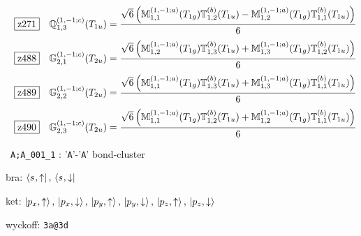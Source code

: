 \documentclass[fleqn,10pt,landscape]{jsarticle}
\begin{document}
\begin{dmath*}
\hspace*{3mm}\fbox{z271}\quad \mathbb{Q}_{1,3}^{(1,-1;c)}(T_{1u})=\frac{\sqrt{6} \left(\mathbb{M}_{1,1}^{(1,-1;a)}(T_{1g}) \mathbb{T}_{1,2}^{(b)}(T_{1u}) - \mathbb{M}_{1,2}^{(1,-1;a)}(T_{1g}) \mathbb{T}_{1,1}^{(b)}(T_{1u})\right)}{6}
\end{dmath*}
\begin{dmath*}
\hspace*{3mm}\fbox{z488}\quad \mathbb{G}_{2,1}^{(1,-1;c)}(T_{2u})=\frac{\sqrt{6} \left(\mathbb{M}_{1,2}^{(1,-1;a)}(T_{1g}) \mathbb{T}_{1,3}^{(b)}(T_{1u}) + \mathbb{M}_{1,3}^{(1,-1;a)}(T_{1g}) \mathbb{T}_{1,2}^{(b)}(T_{1u})\right)}{6}
\end{dmath*}
\begin{dmath*}
\hspace*{3mm}\fbox{z489}\quad \mathbb{G}_{2,2}^{(1,-1;c)}(T_{2u})=\frac{\sqrt{6} \left(\mathbb{M}_{1,1}^{(1,-1;a)}(T_{1g}) \mathbb{T}_{1,3}^{(b)}(T_{1u}) + \mathbb{M}_{1,3}^{(1,-1;a)}(T_{1g}) \mathbb{T}_{1,1}^{(b)}(T_{1u})\right)}{6}
\end{dmath*}
\begin{dmath*}
\hspace*{3mm}\fbox{z490}\quad \mathbb{G}_{2,3}^{(1,-1;c)}(T_{2u})=\frac{\sqrt{6} \left(\mathbb{M}_{1,1}^{(1,-1;a)}(T_{1g}) \mathbb{T}_{1,2}^{(b)}(T_{1u}) + \mathbb{M}_{1,2}^{(1,-1;a)}(T_{1g}) \mathbb{T}_{1,1}^{(b)}(T_{1u})\right)}{6}
\end{dmath*}
\vspace{5mm}

\noindent\textbullet\, \texttt{A;A_001_1} : '\texttt{A}'-'\texttt{A}' bond-cluster

\noindent\quad * bra: $\bra{s_{},\uparrow},\, \bra{s_{},\downarrow}$

\noindent\quad * ket: $\ket{p_{x},\uparrow},\, \ket{p_{x},\downarrow},\, \ket{p_{y},\uparrow},\, \ket{p_{y},\downarrow},\, \ket{p_{z},\uparrow},\, \ket{p_{z},\downarrow}$

\noindent\quad * wyckoff: \texttt{3a@3d}
\end{document}
